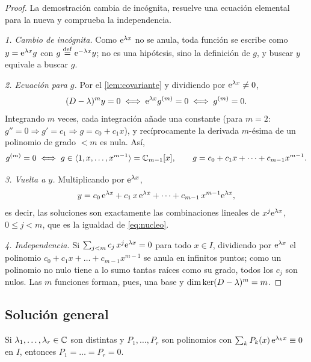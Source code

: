 \begin{proof}
La demostración cambia de incógnita, resuelve una ecuación elemental para
la nueva y comprueba la independencia.

\emph{1. Cambio de incógnita.} Como $\mathrm{e}^{\lambda x}$ no se anula, toda
función se escribe como $y=\mathrm{e}^{\lambda x}g$ con $g\mathrel{\overset{\mathrm{def}}{=}}\mathrm{e}^{-\lambda x}y$;
no es una hipótesis, sino la definición de $g$, y buscar $y$ equivale a
buscar $g$.

\emph{2. Ecuación para $g$.} Por el \cref{lem:covariante} y dividiendo por
$\mathrm{e}^{\lambda x}\neq0$,
\[
  (D-\lambda)^{m}y=0\iff\mathrm{e}^{\lambda x}g^{(m)}=0\iff g^{(m)}=0 .
\]
Integrando $m$ veces, cada integración añade una constante (para $m=2$:
$g''=0\Rightarrow g'=c_1\Rightarrow g=c_0+c_1x$), y recíprocamente la
derivada $m$-ésima de un polinomio de grado $<m$ es nula. Así,
\[
  g^{(m)}=0\iff g\in\langle 1,x,\dots,x^{m-1}\rangle=\mathbb{C}_{m-1}[x],
  \qquad g=c_0+c_1x+\dots+c_{m-1}x^{m-1}.
\]

\emph{3. Vuelta a $y$.} Multiplicando por $\mathrm{e}^{\lambda x}$,
\[
  y=c_0\,\mathrm{e}^{\lambda x}+c_1\,x\,\mathrm{e}^{\lambda x}+\dots+c_{m-1}\,x^{m-1}\mathrm{e}^{\lambda x},
\]
es decir, las soluciones son exactamente las combinaciones lineales de
$x^{j}\mathrm{e}^{\lambda x}$, $0\le j<m$, que es la igualdad de \eqref{eq:nucleo}.

\emph{4. Independencia.} Si $\sum_{j<m}c_j\,x^{j}\mathrm{e}^{\lambda x}=0$ para todo
$x\in I$, dividiendo por $\mathrm{e}^{\lambda x}$ el polinomio
$c_0+c_1x+\dots+c_{m-1}x^{m-1}$ se anula en infinitos puntos; como un
polinomio no nulo tiene a lo sumo tantas raíces como su grado, todos los
$c_j$ son nulos. Las $m$ funciones forman, pues, una base y
$\dim\operatorname{ker}(D-\lambda)^{m}=m$.
\end{proof}

\subsection{Solución general}\label{sec:general-multiples}

\begin{lema}[Independencia]\label{lem:independencia}
Si $\lambda_1,\dots,\lambda_r\in\mathbb{C}$ son distintas y $P_1,\dots,P_r$ son
polinomios con $\sum_kP_k(x)\,\mathrm{e}^{\lambda_kx}\equiv0$ en $I$, entonces
$P_1=\dots=P_r=0$.
\end{lema}

